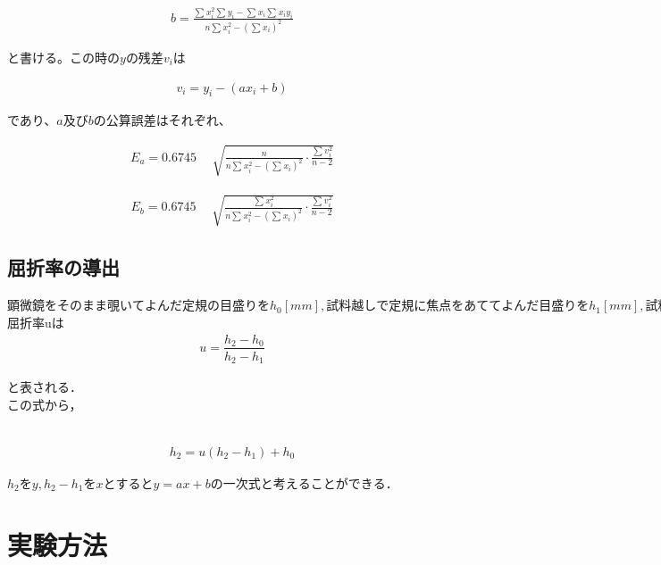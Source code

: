 \documentclass[a4paper,1pt]{jsarticle}
\begin{document}
      \begin{eqnarray}
        \label{kaisekiB}
        b=\frac{\sum{}^{}x_i^2 \sum{}^{}y_i-\sum{}^{}x_i \sum{}^{}x_iy_i}{n\sum{}^{}x_i^2-(\sum{}^{}x_i)^2}
      \end{eqnarray}

      と書ける。この時の$y$の残差$v_i$は

      \begin{eqnarray}
        \label{kaisekizansa}
        v_i=y_i-(ax_i+b)
      \end{eqnarray}

      であり、$a$及び$b$の公算誤差はそれぞれ、

  
      \begin{eqnarray}
        \label{kaisekigosaA}
        E_a=0.6745\quad\sqrt[]{\frac{n}{n\sum{}^{}x_i^2 - (\sum{}^{}x_i)^2}\cdot\frac{\sum{}^{}v_i^2}{n-2}}
      \end{eqnarray}

      \begin{eqnarray}
        \label{kaisekigosaB}
        E_b=0.6745\quad\sqrt[]{\frac{\sum{}^{}x_i^2}{n\sum{}^{}x_i^2 - (\sum{}^{}x_i)^2}\cdot\frac{\sum{}^{}v_i^2}{n-2}}
      \end{eqnarray}

  \subsection*{屈折率の導出}
  $顕微鏡をそのまま覗いてよんだ定規の目盛りをh_0[mm],試料越しで定規に焦点をあててよんだ目盛りをh_1[mm],試料の傷に焦点をあててよんだ目盛りをh_2[mm]とすると，$\\

  屈折率uは\\

  \begin{eqnarray}
    \label{kusseturitu}
    u=\dfrac{h_2-h_0}{h_2-h_1}
  \end{eqnarray}

  と表される．\\

  この式から，

  　\begin{eqnarray}
    \label{kusseturitu2}
    h_2=u(h_2-h_1)+h_0
  \end{eqnarray}

  $h_2をy,h_2-h_1をxとするとy=ax+bの一次式と考えることができる．$\\

\section{実験方法}
\end{document}
